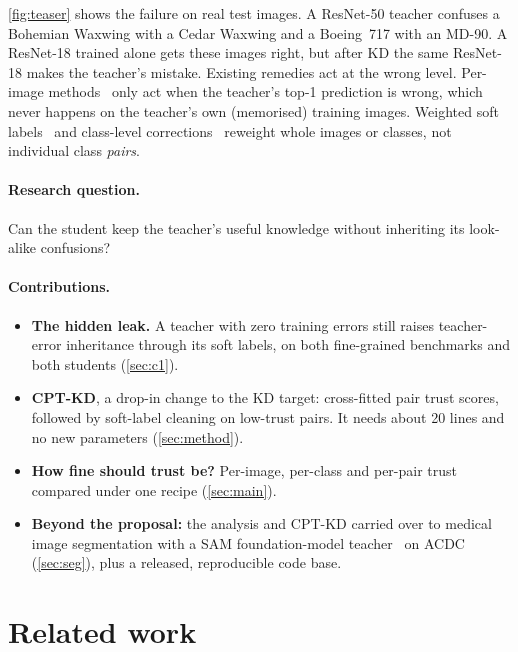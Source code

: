 \documentclass[10pt,twocolumn,letterpaper]{article}
\begin{document}
\cref{fig:teaser} shows the failure on real test images. A ResNet-50 teacher confuses a Bohemian Waxwing with a Cedar Waxwing and a Boeing~717 with an MD-90. A ResNet-18 trained alone gets these images right, but after KD the same ResNet-18 makes the teacher's mistake. Existing remedies act at the wrong level. Per-image methods~\cite{wen2021preparing,mishra2026correctness} only act when the teacher's top-1 prediction is wrong, which never happens on the teacher's own (memorised) training images. Weighted soft labels~\cite{zhou2021wsl} and class-level corrections~\cite{lukasik2022teacherspet} reweight whole images or classes, not individual class \emph{pairs}.

\paragraph{Research question.} Can the student keep the teacher's useful knowledge without inheriting its look-alike confusions?

\paragraph{Contributions.}
\begin{itemize}
\item[\textbf{C1}] \textbf{The hidden leak.} A teacher with zero training errors still raises teacher-error inheritance through its soft labels, on both fine-grained benchmarks and both students (\cref{sec:c1}).
\item[\textbf{C2}] \textbf{CPT-KD}, a drop-in change to the KD target: cross-fitted pair trust scores, followed by soft-label cleaning on low-trust pairs. It needs about 20 lines and no new parameters (\cref{sec:method}).
\item[\textbf{C3}] \textbf{How fine should trust be?} Per-image, per-class and per-pair trust compared under one recipe (\cref{sec:main}).
\item[\textbf{+}] \textbf{Beyond the proposal:} the analysis and CPT-KD carried over to medical image segmentation with a SAM foundation-model teacher~\cite{kirillov2023sam} on ACDC~\cite{bernard2018acdc} (\cref{sec:seg}), plus a released, reproducible code base.
\end{itemize}

\section{Related work}
\label{sec:related}
\end{document}
